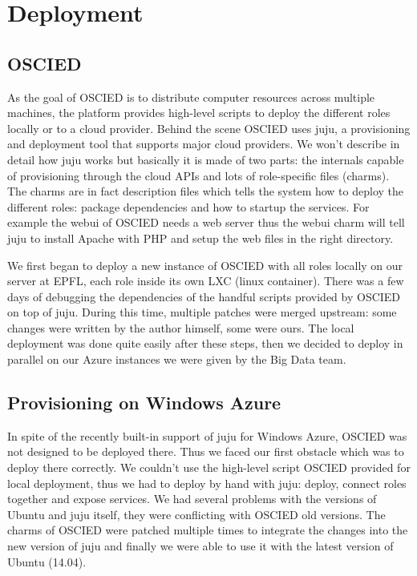 \documentclass[a4paper,12pt]{article}
\begin{document}

\section{Deployment}
\subsection{OSCIED}
As the goal of OSCIED is to distribute computer resources across multiple machines, the platform provides high-level scripts to deploy the different roles locally or to a cloud provider.
Behind the scene OSCIED uses juju, a provisioning and deployment tool that supports major cloud providers.
We won't describe in detail how juju works but basically it is made of two parts: the internals capable of provisioning through the cloud APIs and lots of role-specific files (charms).
The charms are in fact description files which tells the system how to deploy the different roles: package dependencies and how to startup the services.
For example the webui of OSCIED needs a web server thus the webui charm will tell juju to install Apache with PHP and setup the web files in the right directory.

We first began to deploy a new instance of OSCIED with all roles locally on our
server at EPFL, each role inside its own LXC (linux container).
There was a few days of debugging the dependencies of the handful scripts provided by OSCIED on top of juju.
During this time, multiple patches were merged upstream: some changes were written by the author himself, some were ours.
The local deployment was done quite easily after these steps, then we decided to deploy in parallel on our Azure instances we were given by the Big Data team.

\subsection{Provisioning on Windows Azure}
In spite of the recently built-in support of juju for Windows Azure, OSCIED was not designed to be deployed there.
Thus we faced our first obstacle which was to deploy there correctly.
We couldn't use the high-level script OSCIED provided for local deployment, thus we had to deploy by hand with juju: deploy, connect roles together and expose services.
We had several problems with the versions of Ubuntu and juju itself, they were conflicting with OSCIED old versions.
The charms of OSCIED were patched multiple times to integrate the changes into the new version of juju and finally we were able to use it with the latest version of Ubuntu (14.04).
\end{document}
